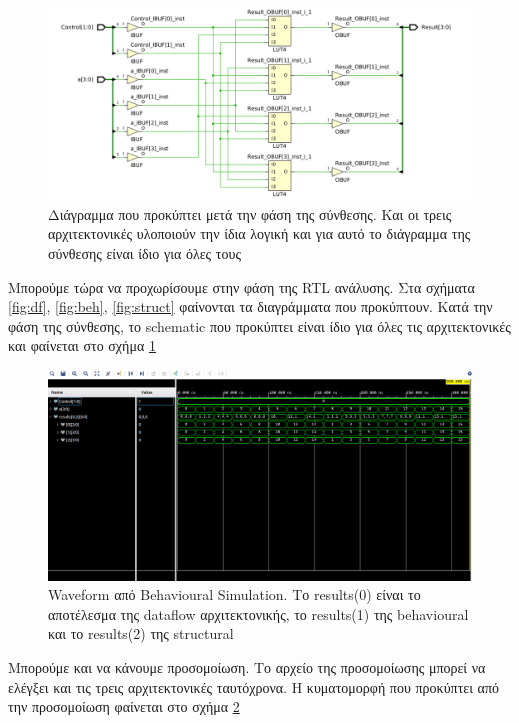 \documentclass[11pt, a4paper]{report}
\begin{document}
\begin{figure}
  \includegraphics[width=\textwidth]{./images/alu-2/Synth_Schem_ALU_2.png}
  \caption{Διάγραμμα που προκύπτει μετά την φάση της σύνθεσης. Και οι τρεις αρχιτεκτονικές υλοποιούν την ίδια λογική και για αυτό το διάγραμμα της σύνθεσης είναι ίδιο για όλες τους}
  \label{fig:synth}
\end{figure}

Μπορούμε τώρα να προχωρίσουμε στην φάση της RTL ανάλυσης. Στα σχήματα \ref{fig:df}, \ref{fig:beh}, \ref{fig:struct} φαίνονται τα διαγράμματα που προκύπτουν.
Κατά την φάση της σύνθεσης, το schematic που προκύπτει είναι ίδιο για όλες τις αρχιτεκτονικές και φαίνεται στο σχήμα \ref{fig:synth}

\begin{figure}
  \includegraphics[width=\textwidth]{./images/alu-2/beh-sim-0.png}
  \caption{Waveform από Behavioural Simulation. Το results(0) είναι το αποτέλεσμα της dataflow αρχιτεκτονικής, το results(1) της behavioural και το results(2) της structural}
  \label{fig:beh_wfm}
\end{figure}

Μπορούμε και να κάνουμε προσομοίωση. Το αρχείο της προσομοίωσης μπορεί να ελέγξει και τις τρεις αρχιτεκτονικές ταυτόχρονα.
Η κυματομορφή που προκύπτει από την προσομοίωση φαίνεται στο σχήμα \ref{fig:beh_wfm}
\end{document}
